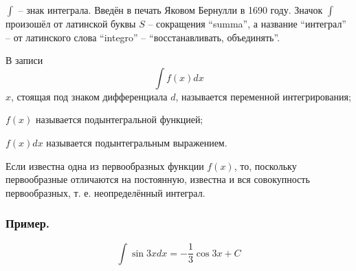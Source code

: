 $\int$ -- знак интеграла. Введён в печать Яковом Бернулли в 1690 году. Значок $\int$ произошёл от латинской буквы $S$ -- сокращения ``summa'', а название ``интеграл'' -- от латинского слова ``integro'' -- ``восстанавливать, объединять''.

В записи $$\int f(x) dx$$
$x$, стоящая под знаком дифференциала $d$, называется переменной интегрирования;

$f(x)$ называется подынтегральной функцией;

$f(x)dx$ называется подынтегральным выражением.


Если известна одна из первообразных функции $f(x)$, то, поскольку первообразные отличаются на постоянную, известна и вся совокупность первообразных, т. е. неопределённый интеграл.

\subsubsection{Пример.}

$$\int \sin 3x dx=-\frac{1}{3} \cos 3x +C$$


